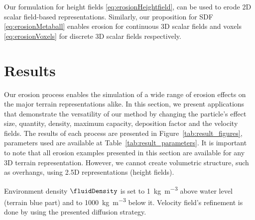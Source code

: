 Our formulation for height fields \eqref{eq:erosionHeightfield}, can be used to erode 2D scalar field-based representations. Similarly, 
our proposition for SDF \eqref{eq:erosionMetaball} enables erosion for continuous 3D scalar fields and voxels \eqref{eq:erosionVoxels} for discrete 3D scalar fields respectively.
\section{Results}
\label{sec:erosion_examples}
Our erosion process enables the simulation of a wide range of erosion effects on the major terrain representations alike. In this section, we present applications that demonstrate the versatility of our method by changing the particle's effect size, quantity, density, maximum capacity, deposition factor and the velocity fields. The results of each process are presented in Figure~\ref{tab:result_figures}, parameters used are available at Table~\ref{tab:result_parameters}. 
It is important to note that all erosion examples presented in this section are available for any 3D terrain representation. However, we cannot create volumetric structure, such as overhangs, using 2.5D representations (height fields).

Environment density $\fluidDensity$ is set to \SI{1}{\kilogram\per\cubic\meter} above water level (terrain blue part) and to \SI{1000}{\kilogram\per\cubic\meter} below it.
Velocity field's refinement is done by using the presented diffusion strategy.

